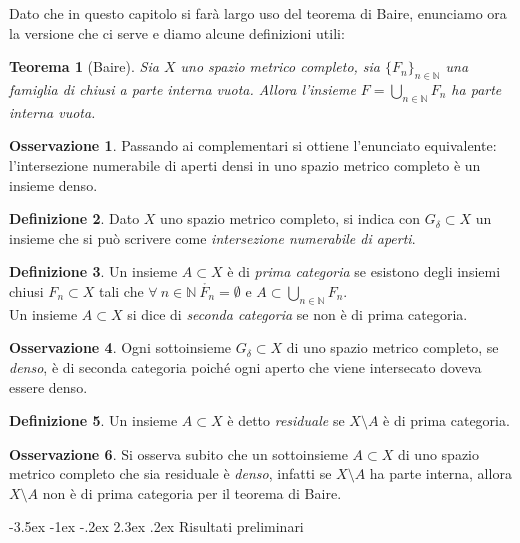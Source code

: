 \documentclass[a4paper,11pt]{book}
\makeatletter
\theoremstyle{plain}
\newtheorem{teo}{Teorema}[chapter]
\theoremstyle{definition}
\newtheorem{defn}{Definizione}[chapter]
\newtheorem{oss}[defn]{Osservazione}
\theoremstyle{remark}
\newcommand{\N}{\mathbb{N}}
\renewcommand\section{\@startsection {section}{1}{\z@}%
                                   {-3.5ex \@plus -1ex \@minus -.2ex}%
                                   {2.3ex \@plus.2ex}%
                                   {\normalfont\Large\bfseries}}
\makeatother
\begin{document}
Dato che in questo capitolo si farà largo uso del teorema di Baire, enunciamo ora la versione che ci serve e diamo alcune definizioni utili:
\begin{teo}[Baire]
	Sia $X$ uno spazio metrico completo, sia $\{F_n\}_{n\in\N}$ una famiglia di chiusi a parte interna vuota. Allora l'insieme $F=\bigcup_{n\in \N}F_n$ ha parte interna vuota.
\end{teo}

\begin{oss}
	Passando ai complementari si ottiene l'enunciato equivalente: l'intersezione numerabile di aperti densi in uno spazio metrico completo è un insieme denso.
\end{oss}

\begin{defn}
	Dato $X$ uno spazio metrico completo, si indica con $G_{\delta}\subset X$ un insieme che si può scrivere come \textit{intersezione numerabile di aperti}.
\end{defn}

\begin{defn}
	Un insieme $A\subset X$ è di \textit{prima categoria} se esistono degli insiemi chiusi $F_n\subset X$ tali che $\forall\ n\in \N\ \mathring{F_n} = \emptyset$ e $A\subset\bigcup_{n\in \N}F_n$.\\
	Un insieme $A\subset X$ si dice di \textit{seconda categoria} se non è di prima categoria.
\end{defn}

\begin{oss}
	Ogni sottoinsieme $G_{\delta}\subset X$ di uno spazio metrico completo, se \textit{denso}, è di seconda categoria poiché ogni aperto che viene intersecato doveva essere denso.
\end{oss}

\begin{defn}
	Un insieme $A\subset X$ è detto \textit{residuale} se $X\setminus A$ è di prima categoria.
\end{defn}
\begin{oss}
	Si osserva subito che un sottoinsieme $A\subset X$ di uno spazio metrico completo che sia residuale è \textit{denso}, infatti se $X\setminus A$ ha parte interna, allora $X\setminus A$ non è di prima categoria per il teorema di Baire.
\end{oss}





\section{Risultati preliminari}
\end{document}
